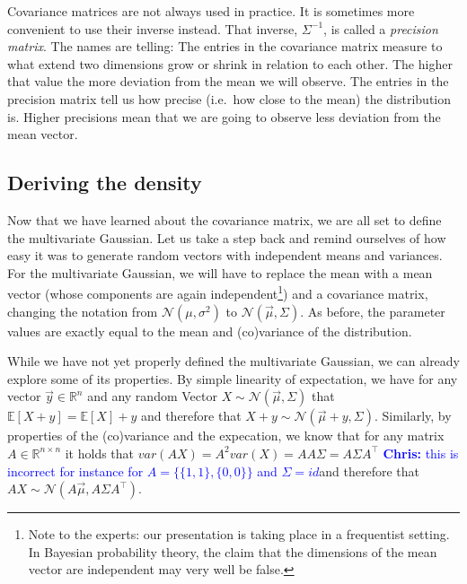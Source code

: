 \documentclass[a4paper,11pt,leqno]{report}\usepackage[]{graphicx}\usepackage[]{color}
\newcommand{\E}{\mathbb{E}}
\newcommand{\N}[2]{\mathcal{N}\left( #1, #2 \right)}
\newcommand{\chris}[1]{ \textcolor{blue}{\textbf{Chris:} #1}}
\begin{document}
Covariance matrices are not always used in practice. It is sometimes more convenient to use their inverse instead. That inverse, $ \Sigma^{-1} $, is called a \emph{precision
matrix}. The names are telling: The entries in the covariance matrix measure to what extend two dimensions grow or shrink in relation to each other. The higher
that value the more deviation from the mean we will observe. 
The entries in the precision matrix tell us how precise (i.e.\ how close to the mean) the distribution is. Higher
precisions mean that we are going to observe less deviation from the mean vector.

\subsection{Deriving the density}

Now that we have learned about the covariance matrix, we are all set to define the multivariate Gaussian. Let us take a step back and remind ourselves of how easy
it was to generate random vectors with independent means and variances. For the multivariate Gaussian, we will have to replace the mean with a mean vector (whose
components are again independent\footnote{Note to the experts: our presentation is taking place in a frequentist setting. In Bayesian probability theory, the claim that
the dimensions of the mean vector are independent may very well be false.}) and a covariance matrix, changing the notation from $ \N{\mu}{\sigma^{2}} $
to $ \N{\vec{\mu}}{\Sigma} $. As before, the parameter values are exactly equal to the mean and (co)variance of the distribution.

While we have not yet properly defined the multivariate Gaussian, we can already explore some of its properties. By simple linearity of expectation, we have
for any vector $ \vec{y} \in \mathbb{R}^{n} $ and any random Vector $ X \sim \N{\vec{\mu}}{\Sigma} $ that $ \E[X + y] = \E[X] + y $ and therefore that
$ X + y \sim \N{\vec{\mu} + y}{\Sigma} $. Similarly, by properties of the (co)variance and the expecation, 
we know that for any matrix $ A \in \mathbb{R}^{n\times n} $ it holds that
$ var(AX) = A^{2}var(X) = AA\Sigma = A\Sigma A^{\top} $ \chris{this is incorrect for instance for $A= \{\{1,1\},\{0,0\}\}$ and $\Sigma = id$}and therefore that $ AX \sim \N{A\vec{\mu}}{A\Sigma A^{\top}} $.
\end{document}
